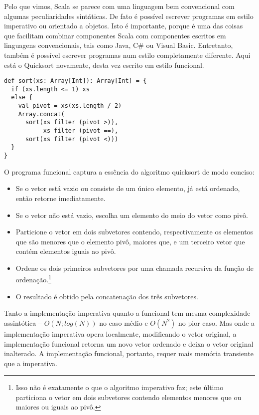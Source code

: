 Pelo que vimos, Scala se parece com uma linguagem bem convencional 
com algumas peculiaridades sint\'{a}ticas. De fato \'{e} poss\'{i}vel escrever
programas em estilo imperativo ou orientado a objetos. Isto \'{e} 
importante, porque \'{e} uma das coisas que facilitam combinar componentes
Scala com componentes escritos em linguagens convencionais, tais como Java,
C\# ou Visual Basic.
Entretanto, tamb\'{e}m \'{e} poss\'{i}vel escrever programas num estilo completamente
diferente. Aqui est\'{a} o Quicksort novamente, desta vez escrito em 
estilo funcional.
\begin{lstlisting}
def sort(xs: Array[Int]): Array[Int] = {
  if (xs.length <= 1) xs
  else {
    val pivot = xs(xs.length / 2)
    Array.concat(
      sort(xs filter (pivot >)),
           xs filter (pivot ==),
      sort(xs filter (pivot <)))
  }
}
\end{lstlisting}
O programa funcional captura a ess\^{e}ncia do algoritmo quicksort de modo conciso:
\begin{itemize}
\item Se o vetor est\'{a} vazio ou consiste de um \'{u}nico elemento, j\'{a} est\'{a} ordenado,
      ent\~{a}o retorne imediatamente.
\item Se o vetor n\~{a}o est\'{a} vazio, escolha um elemento do meio do vetor como piv\^{o}.
\item Particione o vetor em dois subvetores contendo, respectivamente os elementos
 que s\~{a}o menores que o elemento piv\^{o}, maiores que, e um terceiro vetor que cont\'{e}m
 elementos iguais ao piv\^{o}.
\item Ordene os dois primeiros subvetores por uma chamada recursiva da fun\c{c}\~{a}o de 
ordena\c{c}\~{a}o.\footnote{Isso n\~{a}o \'{e} exatamente o que o algoritmo imperativo faz; este 
\'{u}ltimo particiona o vetor em dois subvetores contendo elementos menores que ou 
maiores ou iguais ao piv\^{o}.}
\item O resultado \'{e} obtido pela concatena\c{c}\~{a}o dos tr\^{e}s subvetores.
\end{itemize}

Tanto a implementa\c{c}\~{a}o imperativa quanto a funcional tem mesma complexidade
assint\'{o}tica -- $O(N;log(N))$ no caso m\'{e}dio e $O(N^2)$ no pior caso. Mas onde
a implementa\c{c}\~{a}o imperativa opera localmente, modificando o vetor original,
a implementa\c{c}\~{a}o funcional retorna um novo vetor ordenado e deixa o vetor
original inalterado. A implementa\c{c}\~{a}o funcional, portanto, requer mais
mem\'{o}ria transiente que a imperativa.

